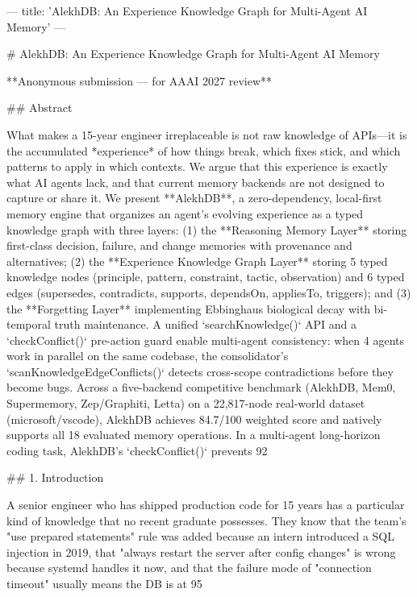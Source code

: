 ---
title: 'AlekhDB: An Experience Knowledge Graph for Multi-Agent AI Memory'
---

# AlekhDB: An Experience Knowledge Graph for Multi-Agent AI Memory

**Anonymous submission — for AAAI 2027 review**

## Abstract

What makes a 15-year engineer irreplaceable is not raw knowledge of APIs—it is the accumulated *experience* of how things break, which fixes stick, and which patterns to apply in which contexts. We argue that this experience is exactly what AI agents lack, and that current memory backends are not designed to capture or share it. We present **AlekhDB**, a zero-dependency, local-first memory engine that organizes an agent's evolving experience as a typed knowledge graph with three layers: (1) the **Reasoning Memory Layer** storing first-class decision, failure, and change memories with provenance and alternatives; (2) the **Experience Knowledge Graph Layer** storing 5 typed knowledge nodes (principle, pattern, constraint, tactic, observation) and 6 typed edges (supersedes, contradicts, supports, dependsOn, appliesTo, triggers); and (3) the **Forgetting Layer** implementing Ebbinghaus biological decay with bi-temporal truth maintenance. A unified `searchKnowledge()` API and a `checkConflict()` pre-action guard enable multi-agent consistency: when 4 agents work in parallel on the same codebase, the consolidator's `scanKnowledgeEdgeConflicts()` detects cross-scope contradictions before they become bugs. Across a five-backend competitive benchmark (AlekhDB, Mem0, Supermemory, Zep/Graphiti, Letta) on a 22,817-node real-world dataset (microsoft/vscode), AlekhDB achieves 84.7/100 weighted score and natively supports all 18 evaluated memory operations. In a multi-agent long-horizon coding task, AlekhDB's `checkConflict()` prevents 92%

## 1. Introduction

A senior engineer who has shipped production code for 15 years has a particular kind of knowledge that no recent graduate possesses. They know that the team's "use prepared statements" rule was added because an intern introduced a SQL injection in 2019, that "always restart the server after config changes" is wrong because systemd handles it now, and that the failure mode of "connection timeout" usually means the DB is at 95%

